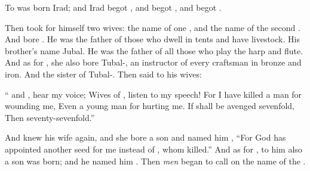 \bverse To  was born Irad; and Irad begot , and  begot , and  begot .

\bverse Then  took for himself two wives: the name of one \was {}, and the name of the second \was {}.
\bverse And  bore . He was the father of those who dwell in tents and have livestock.
\bverse His brother's name \was Jubal. He was the father of all those who play the harp and flute.
\bverse And as for , she also bore Tubal-\Cain, an instructor of every craftsman in bronze and iron. And the sister of Tubal-\Cain \was {}.
\bverse Then  said to his wives:
\begin{bquotation}
`` and , hear my voice; Wives of , listen to my speech! For I have killed a man for wounding me, Even a young man for hurting me. \bverse If \Cain shall be avenged sevenfold, Then  seventy-sevenfold.''
\end{bquotation}


\bverse And \Adam knew his wife again, and she bore a son and named him , ``For God has appointed another seed for me instead of \Abel, whom \Cain killed.''
\bverse And as for , to him also a son was born; and he named him . Then \textit{men} began to call on the name of the \lord.
